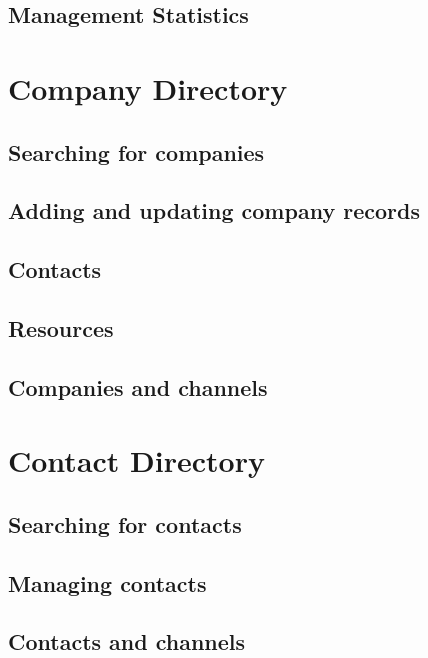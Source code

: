 \documentclass[12 pt]{book}
\begin{document}
\section{Management Statistics}

%
%
%

\chapter{Company Directory}

\section{Searching for companies}

\section{Adding and updating company records}

\section{Contacts}

\section{Resources}

\section{Companies and channels}

%
%
%

\chapter{Contact Directory}

\section{Searching for contacts}

\section{Managing contacts}

\section{Contacts and channels}
\end{document}
